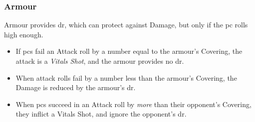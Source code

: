 \subsubsection*{Armour}

Armour provides \gls{dr}, which can protect against Damage, but only if the \gls{pc} rolls high enough.

\begin{itemize}
  \item
  If \glspl{pc} fail an Attack roll by a number equal to the armour's Covering, the attack is a \textit{Vitals Shot}, and the armour provides no \gls{dr}.
  \item
  When attack rolls fail by a number less than the armour's Covering, the Damage is reduced by the armour's \gls{dr}.
  \item
  When \glspl{pc} succeed in an Attack roll by \emph{more} than their opponent's Covering, they inflict a Vitals Shot, and ignore the opponent's \gls{dr}.
\end{itemize}

\commonArmourChart
